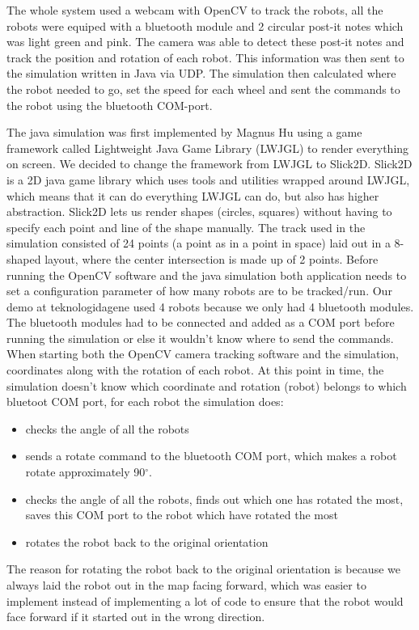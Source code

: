The whole system used a webcam with OpenCV to track the robots, all the robots were equiped with a bluetooth module and 2 circular post-it notes which was light green and pink. The camera was able to detect these post-it notes and track the position and rotation of each robot. This information was then sent to the simulation written in Java via UDP.
The simulation then calculated where the robot needed to go, set the speed for each wheel and sent the commands to the robot using the bluetooth COM-port.

The java simulation was first implemented by Magnus Hu using a game framework called Lightweight Java Game Library (LWJGL) to render everything on screen. We decided to change the framework from LWJGL to Slick2D. Slick2D is a 2D java game library which uses tools and utilities wrapped around LWJGL, which means that it can do everything LWJGL can do, but also has higher abstraction. Slick2D lets us render shapes (circles, squares) without having to specify each point and line of the shape manually.
The track used in the simulation consisted of 24 points (a point as in a point in space) laid out in a 8-shaped layout, where the center intersection is made up of 2 points.
Before running the OpenCV software and the java simulation both application needs to set a configuration parameter of how many robots are to be tracked/run. Our demo at teknologidagene used 4 robots because we only had 4 bluetooth modules. The bluetooth modules had to be connected and added as a COM port before running the simulation or else it wouldn't know where to send the commands. When starting both the OpenCV camera tracking software and the simulation, coordinates along with the rotation of each robot. At this point in time, the simulation doesn't know which coordinate and rotation (robot) belongs to which bluetoot COM port, for each robot the simulation does:
\begin{itemize}
    \item checks the angle of all the robots
    \item sends a rotate command to the bluetooth COM port, which makes a robot rotate approximately 90$^{\circ}$.
    \item checks the angle of all the robots, finds out which one has rotated the most, saves this COM port to the robot which have rotated the most
    \item rotates the robot back to the original orientation
\end{itemize}
The reason for rotating the robot back to the original orientation is because we always laid the robot out in the map facing forward, which was easier to implement instead of implementing a lot of code to ensure that the robot would face forward if it started out in the wrong direction.
